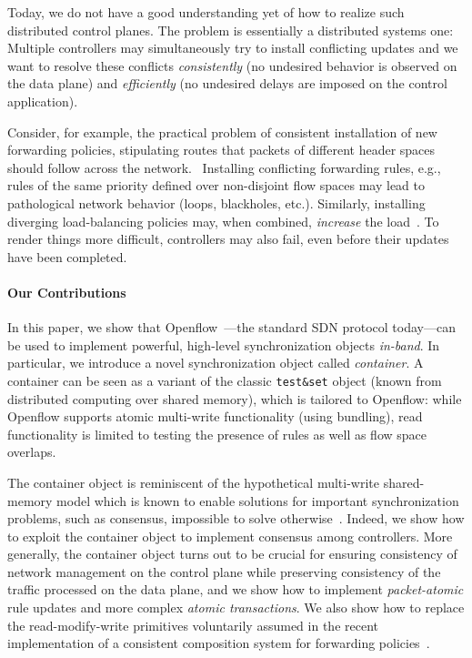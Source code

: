 \documentclass[conference]{sigcomm-alternate}
\begin{document}
Today, we do not have a good understanding yet of how to realize
such distributed control planes. The problem is essentially a
distributed systems
one: Multiple controllers may simultaneously try to
install conflicting updates and we want to resolve these conflicts
\emph{consistently} (no undesired behavior is observed on the data
plane) and \emph{efficiently} (no undesired delays are imposed on the
control application).

Consider, for example, the practical problem of
consistent installation of new forwarding policies, stipulating routes
that packets of different header spaces should follow across the
network.~\cite{network-update,roger-hotnets,correct,stn}
Installing conflicting forwarding rules, e.g., rules of the same priority defined over non-disjoint
flow spaces may lead to pathological network behavior (loops,
blackholes, etc.).
Similarly, installing diverging load-balancing policies may,
when combined, \emph{increase} the load~\cite{log-cent}.
To render things more difficult, controllers may also fail,
even before their updates have been completed.

\paragraph{Our Contributions}
In this paper, we show that
Openflow~\cite{of-spec}---the standard SDN protocol today---can
be used to implement powerful, high-level
synchronization
objects \emph{in-band}.
In particular, we introduce a novel synchronization object
called \emph{container}. A container can be seen as
a variant of the classic \texttt{test\&set} object
(known from distributed computing over shared memory),
which is tailored to Openflow: while Openflow supports
atomic multi-write functionality (using bundling),
read functionality is limited to testing the presence of
rules as well as flow space overlaps.

The container object is reminiscent of the hypothetical multi-write
shared-memory model which is known to enable solutions for important
synchronization problems, such as consensus, impossible to solve
otherwise~\cite{multi-objects}.
Indeed, we show how to exploit the container object to implement
consensus among controllers.
More generally, the container object turns out to be
crucial for ensuring consistency of network
management on the control plane while preserving consistency of the
traffic processed on the data plane, and we show how to implement
\emph{packet-atomic} rule updates and more complex
\emph{atomic transactions}.
We also show how to replace the read-modify-write
primitives voluntarily assumed in the recent implementation of a
consistent composition system for forwarding policies~\cite{cpc}.
\end{document}
